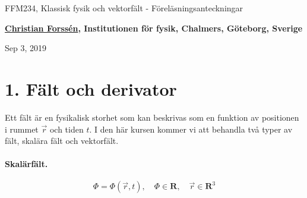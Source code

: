\documentclass[%
oneside,                 %
final,                   %
10pt]{article}
\begin{document}

\newcommand{\exercisesection}[1]{\subsection*{#1}}







\thispagestyle{empty}

\begin{center}
{\LARGE\bf
\begin{spacing}{1.25}
FFM234, Klassisk fysik och vektorfält - Föreläsningsanteckningar
\end{spacing}
}
\end{center}


\begin{center}
{\bf \href{{http://fy.chalmers.se/subatom/tsp/}}{Christian Forssén}, Institutionen för fysik, Chalmers, Göteborg, Sverige${}^{}$} \\ [0mm]
\end{center}

\begin{center}
\end{center}
    

\begin{center}
Sep 3, 2019
\end{center}

\vspace{1cm}


\section*{1. Fält och derivator}

Ett fält är en fysikalisk storhet som kan beskrivas som en funktion av
positionen i rummet $\vec{r}$ och tiden $t$.  I den här kursen kommer vi
att behandla två typer av fält, skalära fält och vektorfält.

\paragraph{Skalärfält.}
\begin{equation}
\Phi = \Phi(\vec{r},t), \quad \Phi \in \mathbf{R},\quad \vec{r} \in \mathbf{R}^3
\end{equation}
\end{document}

